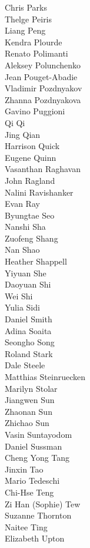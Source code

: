 Chris Parks\\
Thelge Peiris\\
Liang Peng\\
Kendra Plourde\\
Renato Polimanti\\
Aleksey Polunchenko\\
Jean Pouget-Abadie\\
Vladimir Pozdnyakov\\
Zhanna Pozdnyakova\\
Gavino Puggioni\\
Qi Qi\\
Jing Qian\\
Harrison  Quick\\
Eugene Quinn\\
Vasanthan Raghavan\\
John Ragland\\
Nalini Ravishanker\\
Evan Ray\\
Byungtae Seo\\
Nanshi Sha\\
Zuofeng Shang\\
Nan Shao\\
Heather Shappell\\
Yiyuan She\\
Daoyuan Shi\\
Wei Shi\\
Yulia Sidi\\
Daniel Smith\\
Adina Soaita\\
Seongho Song\\
Roland Stark\\
Dale Steele\\
Matthias Steinruecken\\
Marilyn Stolar\\
Jiangwen Sun\\
Zhaonan Sun\\
Zhichao Sun\\
Vasin  Suntayodom\\
Daniel Sussman\\
Cheng Yong Tang\\
Jinxin Tao\\
Mario  Tedeschi\\
Chi-Hse Teng\\
Zi Han (Sophie) Tew\\
Suzanne Thornton\\
Naitee Ting\\
Elizabeth Upton\\
